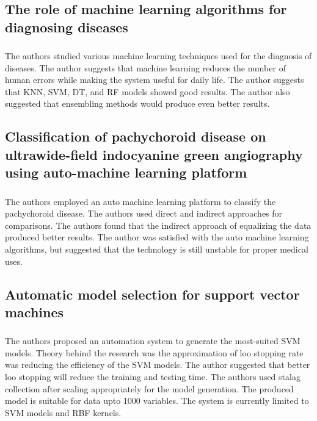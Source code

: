 \subsection{The role of machine learning algorithms for diagnosing diseases}
\subsubsection{\citeauthor*{ref_paper_11} \citeyearpar{ref_paper_11}}

The authors studied various machine learning techniques used for the diagnosis of diseases. The author suggests that machine learning reduces the number of human errors while making the system useful for daily life. The author suggests that KNN, SVM, DT, and RF models showed good results. The author also suggested that ensembling methods would produce even better results.

\subsection{Classification of pachychoroid disease on ultrawide-field indocyanine green angiography using auto-machine learning platform}
\subsubsection{\citeauthor*{ref_paper_8} \citeyearpar{ref_paper_8}}

The authors employed an auto machine learning platform to classify the pachychoroid disease. The authors used direct and indirect approaches for comparisons. The authors found that the indirect approach of equalizing the data produced better results. The author was satisfied with the auto machine learning algorithms, but suggested that the technology is still unstable for proper medical uses.

\subsection{Automatic model selection for support vector machines}
\subsubsection{\citeauthor*{ref_paper_2} \citeyearpar{ref_paper_2}}

The authors proposed an automation system to generate the most-suited SVM models. Theory behind the research was the approximation of loo stopping rate was reducing the efficiency of the SVM models. The author suggested that better loo stopping will reduce the training and testing time. The authors used stalag collection after scaling appropriately for the model generation. The produced model is suitable for data upto 1000 variables. The system is currently limited to SVM models and RBF kernels.

